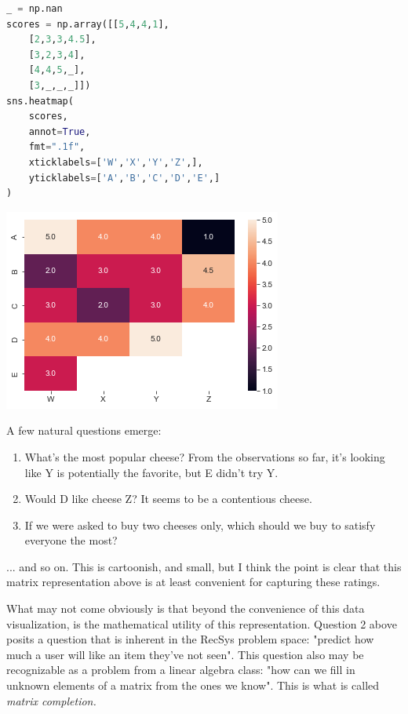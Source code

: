 \begin{lstlisting}[language=Python]
_ = np.nan
scores = np.array([[5,4,4,1],
    [2,3,3,4.5],
    [3,2,3,4],
    [4,4,5,_],
    [3,_,_,_]])
sns.heatmap(
    scores, 
    annot=True, 
    fmt=".1f", 
    xticklabels=['W','X','Y','Z',], 
    yticklabels=['A','B','C','D','E',]
)
\end{lstlisting}

\includegraphics[width=\textwidth-20pt]{book-text/ratings_heatmap.png}

A few natural questions emerge:

\begin{enumerate}
\item What's the most popular cheese? From the observations so far, it's looking like Y is potentially the favorite, but E didn't try Y. 
\item Would D like cheese Z? It seems to be a contentious cheese.
\item If we were asked to buy two cheeses only, which should we buy to satisfy everyone the most?
\end{enumerate}

... and so on. This is cartoonish, and small, but I think the point is clear that this matrix representation above is at least convenient for capturing these ratings.

What may not come obviously is that beyond the convenience of this data visualization, is the mathematical utility of this representation. Question 2 above posits a question that is inherent in the RecSys problem space: "predict how much a user will like an item they've not seen". This question also may be recognizable as a problem from a linear algebra class: "how can we fill in unknown elements of a matrix from the ones we know". This is what is called \emph{matrix completion.}


